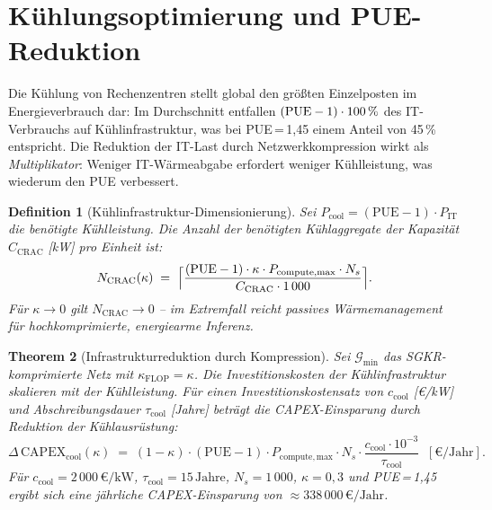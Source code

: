 \documentclass[12pt, a4paper, openany]{report}
\newtheorem{theorem}{Theorem}[chapter]
\newtheorem{definition}[theorem]{Definition}
\newcommand{\calG}{\mathcal{G}}
\begin{document}
\section{Kühlungsoptimierung und PUE-Reduktion}
\label{sec:cooling}

Die Kühlung von Rechenzentren stellt global den größten Einzelposten im
Energieverbrauch dar: Im Durchschnitt entfallen $({\rm PUE} - 1) \cdot 100\,\%$
des IT-Verbrauchs auf Kühlinfrastruktur, was bei PUE\,=\,1{,}45 einem
Anteil von 45\,\% entspricht.  Die Reduktion der IT-Last durch
Netzwerkkompression wirkt als \emph{Multiplikator}: Weniger IT-Wärmeabgabe
erfordert weniger Kühlleistung, was wiederum den PUE verbessert.

\begin{definition}[Kühlinfrastruktur-Dimensionierung]
\label{def:cooling_dimensioning}
Sei $P_{\mathrm{cool}} = (\mathrm{PUE} - 1) \cdot P_{\mathrm{IT}}$ die
benötigte Kühlleistung.  Die Anzahl der benötigten Kühlaggregate der
Kapazität $C_{\mathrm{CRAC}}$ [kW] pro Einheit ist:
\begin{equation}
  \label{eq:n_crac}
  N_{\mathrm{CRAC}}(\kappa)
  \;=\;
  \Bigl\lceil
    \frac{(\mathrm{PUE}-1) \cdot \kappa \cdot P_{\mathrm{compute,max}} \cdot N_s}
         {C_{\mathrm{CRAC}} \cdot 1\,000}
  \Bigr\rceil.
\end{equation}
Für $\kappa \to 0$ gilt $N_{\mathrm{CRAC}} \to 0$ -- im Extremfall reicht
passives Wärmemanagement für hochkomprimierte, energiearme Inferenz.
\end{definition}

\begin{theorem}[Infrastrukturreduktion durch Kompression]
\label{thm:infra_reduction}
Sei $\calG_{\min}$ das SGKR-komprimierte Netz mit $\kappa_{\mathrm{FLOP}} = \kappa$.
Die Investitionskosten der Kühlinfrastruktur skalieren mit der Kühlleistung.
Für einen Investitionskostensatz von $c_{\mathrm{cool}}$ [€/kW] und
Abschreibungsdauer $\tau_{\mathrm{cool}}$ [Jahre] beträgt die
CAPEX-Einsparung durch Reduktion der Kühlausrüstung:
\begin{equation}
  \label{eq:capex_cooling}
  \Delta\,\mathrm{CAPEX}_{\mathrm{cool}}(\kappa)
  \;=\;
  (1 - \kappa) \cdot (\mathrm{PUE} - 1) \cdot P_{\mathrm{compute,max}} \cdot N_s
  \cdot \frac{c_{\mathrm{cool}} \cdot 10^{-3}}{\tau_{\mathrm{cool}}}
  \;\;[\text{€/Jahr}].
\end{equation}
Für $c_{\mathrm{cool}} = 2\,000\,\text{€/kW}$, $\tau_{\mathrm{cool}} = 15\,\text{Jahre}$,
$N_s = 1\,000$, $\kappa = 0{,}3$ und PUE\,=\,1{,}45 ergibt sich eine
jährliche CAPEX-Einsparung von $\approx 338\,000\,\text{€/Jahr}$.
\end{theorem}
\end{document}
